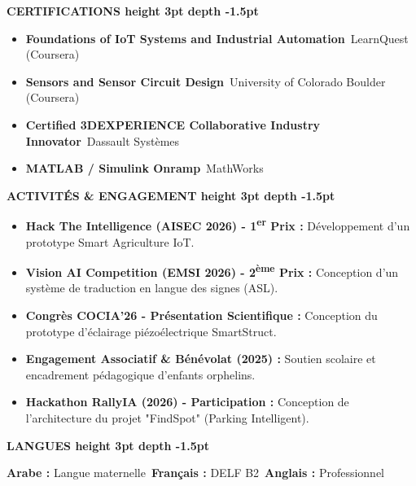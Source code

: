 \documentclass[10pt,a4paper]{altacv}
\renewcommand{\cvsection}[2][]{%
  \vspace{4pt}%
  {\color{heading}\Large\bfseries #2 \hspace{0.2em}\leaders\vrule height 3pt depth -1.5pt\hfill\mbox{}}\par\vspace{3pt}
}
\begin{document}
\cvsection{CERTIFICATIONS}
\begin{itemize}[leftmargin=*, label=\textbullet, nosep, itemsep=1.5pt]
  \item \textbf{Foundations of IoT Systems and Industrial Automation}~\hfill {\color{emphasis}LearnQuest (Coursera)}
  \item \textbf{Sensors and Sensor Circuit Design}~\hfill {\color{emphasis}University of Colorado Boulder (Coursera)}
  \item \textbf{Certified 3DEXPERIENCE Collaborative Industry Innovator}~\hfill {\color{emphasis}Dassault Systèmes}
  \item \textbf{MATLAB / Simulink Onramp}~\hfill {\color{emphasis}MathWorks}
\end{itemize}

\cvsection{ACTIVITÉS \& ENGAGEMENT}
\begin{itemize}[leftmargin=*, label=\textbullet, nosep, itemsep=1.5pt]
  \item \textbf{Hack The Intelligence (AISEC 2026) - 1\textsuperscript{er} Prix :} Développement d’un prototype Smart Agriculture IoT.
  \item \textbf{Vision AI Competition (EMSI 2026) - 2\textsuperscript{ème} Prix :} Conception d’un système de traduction en langue des signes (ASL).
  \item \textbf{Congrès COCIA’26 - Présentation Scientifique :} Conception du prototype d’éclairage piézoélectrique SmartStruct.
  \item \textbf{Engagement Associatif \& Bénévolat (2025) :} Soutien scolaire et encadrement pédagogique d'enfants orphelins.
  \item \textbf{Hackathon RallyIA (2026) - Participation :} Conception de l’architecture du projet "FindSpot" (Parking Intelligent).
\end{itemize}

\cvsection{LANGUES}
\textbf{Arabe :} Langue maternelle~\hfill \textbf{Français :} DELF B2~\hfill \textbf{Anglais :} Professionnel
\end{document}
